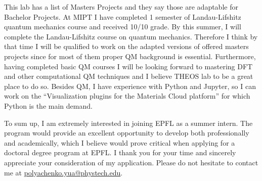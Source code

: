 \documentclass[12pt, a4paper]{awesome-cv}
\begin{document}
\begin{cvletter}
This lab has a list of Masters Projects and they say those are adaptable for Bachelor Projects. At MIPT I have completed 1 semester of Landau-Lifshitz quantum mechanics course and received 10/10 grade. By this summer, I will complete the Landau-Lifshitz course on quantum mechanics. Therefore I think by that time I will be qualified to work on the adapted versions of offered masters projects since for most of them proper QM background is essential. Furthermore, having completed basic QM courses I will be looking forward to mastering DFT and other computational QM techniques and I believe THEOS lab to be a great place to do so. Besides QM, I have experience with Python and Jupyter, so I can work on the “Visualization plugins for the Materials Cloud platform” for which Python is the main demand.


\end{cvletter}



To sum up, I am extremely interested in joining EPFL as a summer intern. The program would provide an excellent opportunity to develop both professionally and academically, which I believe would prove critical when applying for a doctoral degree program at EPFL. I thank you for your time and sincerely appreciate your consideration of my application. Please do not hesitate to contact me at \href{mailto:polyachenko.yua@phystech.edu}{polyachenko.yua@phystech.edu}.


\makeletterclosing
\end{document}

